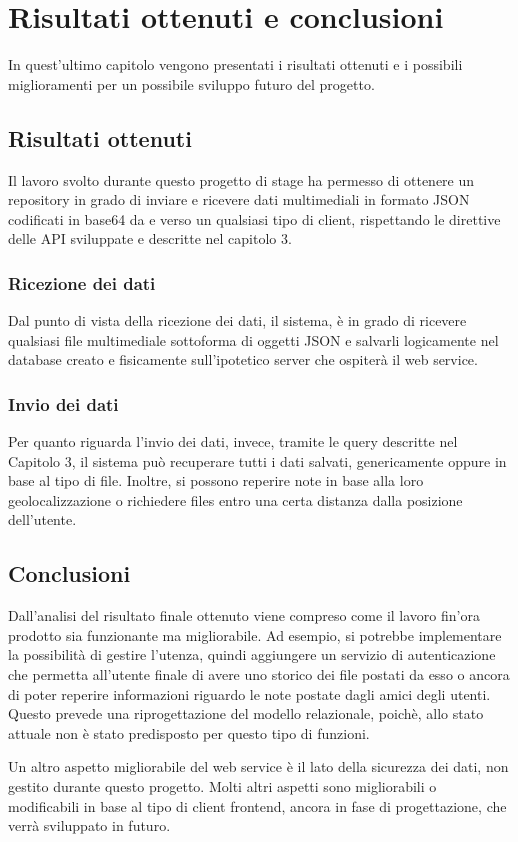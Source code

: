 \chapter{Risultati ottenuti e conclusioni}
In quest'ultimo capitolo vengono presentati i risultati ottenuti e i possibili miglioramenti per un possibile sviluppo futuro del progetto.



\section{Risultati ottenuti}
Il lavoro svolto durante questo progetto di stage ha permesso di ottenere un repository in grado di inviare e ricevere dati multimediali in formato JSON codificati in base64 da e verso un qualsiasi tipo di client, rispettando le direttive delle API sviluppate e descritte nel capitolo 3. 

\subsection{Ricezione dei dati}
Dal punto di vista della ricezione dei dati, il sistema, è in grado di ricevere qualsiasi file multimediale sottoforma di oggetti JSON e salvarli logicamente nel database creato e fisicamente sull'ipotetico server che ospiterà il web service.

\subsection{Invio dei dati}
Per quanto riguarda l'invio dei dati, invece, tramite le query descritte nel Capitolo 3, il sistema può recuperare tutti i dati salvati, genericamente oppure in base al tipo di file. Inoltre, si possono reperire note in base alla loro geolocalizzazione o richiedere files entro una certa distanza dalla posizione dell'utente.

\pagebreak
\section{Conclusioni}
Dall'analisi del risultato finale ottenuto viene compreso come il lavoro fin'ora prodotto sia funzionante ma migliorabile. 
Ad esempio, si potrebbe implementare la possibilità di gestire l'utenza, quindi aggiungere un servizio di autenticazione che permetta all'utente finale di avere uno storico dei file postati da esso o ancora di poter reperire informazioni riguardo le note postate dagli amici degli utenti. Questo prevede una riprogettazione del modello relazionale, poichè, allo stato attuale non è stato predisposto per questo tipo di funzioni.

Un altro aspetto migliorabile del web service è il lato della sicurezza dei dati, non gestito durante questo progetto.
Molti altri aspetti sono migliorabili o modificabili in base al tipo di client frontend, ancora in fase di progettazione, che verrà sviluppato in futuro.